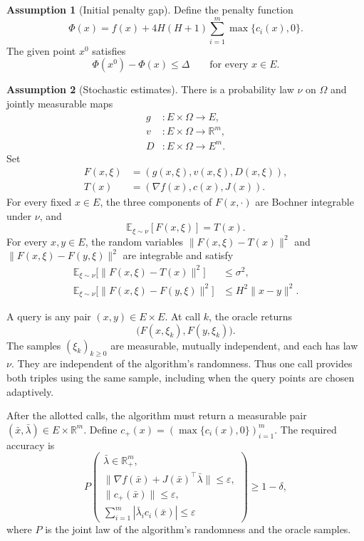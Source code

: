 \documentclass[10pt]{article}
\theoremstyle{definition}
\newtheorem{assumption}{Assumption}
\begin{document}
\begin{assumption}[Initial penalty gap]
Define the penalty function
\[
\Phi(x)=f(x)+4H(H+1)\sum_{i=1}^m\max\{c_i(x),0\}.
\]
The given point $x^0$ satisfies
\[
\Phi(x^0)-\Phi(x)\leq\Delta
\qquad\text{for every }x\in E.
\]
\end{assumption}

\begin{assumption}[Stochastic estimates]
There is a probability law $\nu$ on $\Omega$ and jointly measurable maps
\[
\begin{aligned}
g&:E\times\Omega\to E,\\
v&:E\times\Omega\to\mathbb{R}^m,\\
D&:E\times\Omega\to E^m.
\end{aligned}
\]
Set
\[
\begin{aligned}
F(x,\xi)&=(g(x,\xi),v(x,\xi),D(x,\xi)),\\
T(x)&=(\nabla f(x),c(x),J(x)).
\end{aligned}
\]
For every fixed $x\in E$, the three components of $F(x,\cdot)$ are Bochner integrable under $\nu$, and
\[
\mathbb{E}_{\xi\sim\nu}[F(x,\xi)]=T(x).
\]
For every $x,y\in E$, the random variables $\|F(x,\xi)-T(x)\|^2$ and $\|F(x,\xi)-F(y,\xi)\|^2$ are integrable and satisfy
\[
\begin{aligned}
\mathbb{E}_{\xi\sim\nu}\bigl[\|F(x,\xi)-T(x)\|^2\bigr]
&\leq\sigma^2,\\
\mathbb{E}_{\xi\sim\nu}\bigl[\|F(x,\xi)-F(y,\xi)\|^2\bigr]
&\leq H^2\|x-y\|^2.
\end{aligned}
\]
\end{assumption}

A query is any pair $(x,y)\in E\times E$. At call $k$, the oracle returns
\[
\bigl(F(x,\xi_k),F(y,\xi_k)\bigr).
\]
The samples $(\xi_k)_{k\geq0}$ are measurable, mutually independent, and each has law $\nu$. They are independent of the algorithm's randomness. Thus one call provides both triples using the same sample, including when the query points are chosen adaptively.

After the allotted calls, the algorithm must return a measurable pair $(\bar{x},\bar{\lambda})\in E\times\mathbb{R}^m$. Define $c_+(x)=(\max\{c_i(x),0\})_{i=1}^m$. The required accuracy is
\[
P\!\left(
\begin{gathered}
\bar{\lambda}\in\mathbb{R}_+^m,\\
\|\nabla f(\bar{x})+J(\bar{x})^\top\bar{\lambda}\|\leq\varepsilon,\\
\|c_+(\bar{x})\|\leq\varepsilon,\\
\displaystyle\sum_{i=1}^m|\bar{\lambda}_i c_i(\bar{x})|\leq\varepsilon
\end{gathered}
\right)\geq1-\delta,
\]
where $P$ is the joint law of the algorithm's randomness and the oracle samples.
\end{document}
